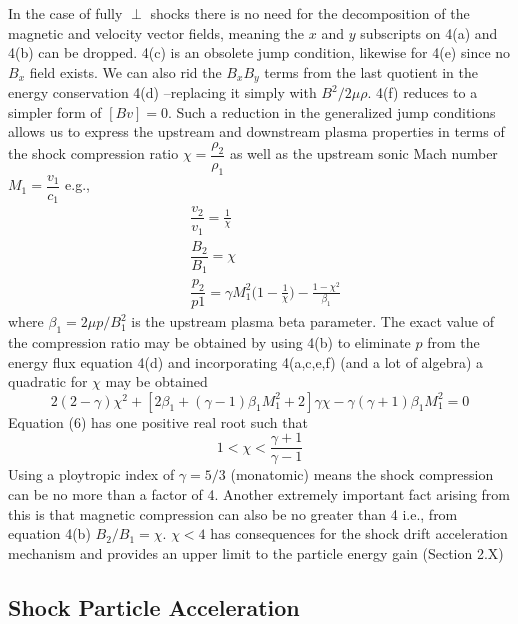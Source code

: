 In the case of fully $\perp$ shocks there is no need for the decomposition of the magnetic and velocity vector fields, meaning the $x$ and $y$ subscripts on 4(a) and 4(b) can be dropped. 4(c) is an obsolete jump condition, likewise for 4(e) since no $B_x$ field exists. We can also rid the $B_{x}B_{y}$ terms from the last quotient in the energy conservation 4(d) --replacing it simply with $B^{2}/2\mu\rho$. 4(f) reduces to a simpler form of $[Bv]=0$. Such a reduction in the generalized jump conditions allows us to express the upstream and downstream plasma properties in terms of the shock compression ratio $\chi=\dfrac{\rho_{2}}{\rho_{1}}$ as well as the upstream sonic Mach number $M_{1}=\dfrac{v_{1}}{c_{1}}$ \citep{priest2000} e.g.,
\begin{subequations}
\begin{align}
&\dfrac{v_{2}}{v_{1}}=\frac{1}{\chi} \\
&\dfrac{B_{2}}{B_{1}}=\chi \\
&\dfrac{p_{2}}{p{1}}=\gamma M_{1}^2\bigg(1-\frac{1}{\chi}\bigg) - \frac{1-\chi^2}{\beta_{1}}
\end{align}
\end{subequations}
where $\beta_{1}=2\mu p/B_{1}^2$ is the upstream plasma beta parameter. The exact value of the compression ratio may be obtained by using 4(b) to eliminate $p$ from the energy flux equation 4(d) and incorporating 4(a,c,e,f) (and a lot of algebra) a quadratic for $\chi$ may be obtained
\begin{equation}
2(2-\gamma)\chi^{2}+[2\beta_{1}+(\gamma-1)\beta_{1}M_{1}^2+2]\gamma\chi - \gamma(\gamma+1)\beta_{1}M_{1}^2=0
\end{equation}
Equation (6) has one positive real root such that 
\begin{equation}
1< \chi < \frac{\gamma+1}{\gamma-1}
\label{eqn:compression}
\end{equation}
Using a ploytropic index of $\gamma=5/3$ (monatomic) means the shock compression can be no more than a factor of 4. Another extremely important fact arising from this is that magnetic compression can also be no greater than 4 i.e., from equation 4(b) $B_{2}/B_{1}=\chi$. $\chi<4$ has consequences for the shock drift acceleration mechanism and provides an upper limit to the particle energy gain (Section 2.X)

\subsection{Shock Particle Acceleration}\label{sec:30}

